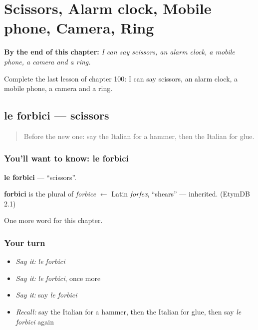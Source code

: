 
\chapter{Scissors, Alarm clock, Mobile phone, Camera, Ring}
\label{ch:it-scissors-alarm-clock-mobile-phone-camera-ring}

\begin{chapteropening}
\textbf{By the end of this chapter:} \emph{I can say scissors, an alarm clock, a mobile phone, a camera and a ring.}

Complete the last lesson of chapter 100: I can say scissors, an alarm clock, a mobile phone, a camera and a ring.
\end{chapteropening}

\section[le forbici]{le forbici — scissors}

\label{lesson:IT-C100-forbici}



\begin{quote}
Before the new one: say the Italian for a hammer, then the Italian for glue.
\end{quote}

\subsection*{You'll want to know: le forbici}
\textbf{le forbici} — \textquotedblleft{}scissors\textquotedblright{}.

\begin{cousinweb}
\textbf{forbici} is the plural of \emph{forbice} $\leftarrow$ Latin \emph{forfex}, \textquotedblleft{}shears\textquotedblright{} — inherited. (EtymDB 2.1)
\end{cousinweb}

\begin{grammarlens}[title={What you've built}]
One more word for this chapter.
\end{grammarlens}

\subsection*{Your turn}
\begin{itemize}
\raggedright
  \item \emph{Say it:} \emph{le forbici}
  \item \emph{Say it:} \emph{le forbici}, once more
  \item \emph{Say it:} say \emph{le forbici}
  \item \emph{Recall:} say the Italian for a hammer, then the Italian for glue, then say \emph{le forbici} again
\end{itemize}

